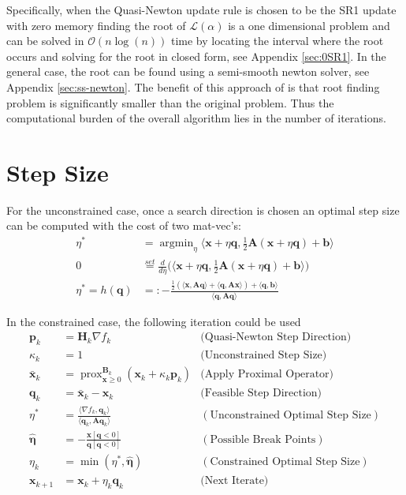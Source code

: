 \documentclass{article}
\newcommand{\x}{\mathbf{x}}
\renewcommand{\b}{\mathbf{b}}
\newcommand{\p}{\mathbf{p}}
\newcommand{\q}{\mathbf{q}}
\newcommand{\A}{\mathbf{A}}
\renewcommand{\H}{\mathbf{H}}
\newcommand{\B}{\mathbf{B}}
\newcommand{\prox}{\operatorname{prox}}
\newcommand{\argmin}{\operatorname{argmin}}
\begin{document}
Specifically, when the Quasi-Newton update rule is chosen to be the SR1 update with zero memory finding the root of $\mathcal{L}(\alpha)$ is a one dimensional problem and can be solved in $\mathcal{O}(n\log(n))$ time by locating the interval where the root occurs and solving for the root in closed form, see Appendix \ref{sec:0SR1}. In the general case, the root can be found using a semi-smooth newton solver, see Appendix \ref{sec:ss-newton}. The benefit of this approach of is that root finding problem is significantly smaller than the original problem. Thus the computational burden of the overall algorithm lies in the number of iterations.

\section{Step Size}
For the unconstrained case, once a search direction is chosen an optimal step size can be computed with the cost of two mat-vec's: 
\begin{align*}
    \eta^* &= \argmin_\eta \langle \x + \eta\q, \tfrac{1}{2}\A(\x + \eta\q) +\b\rangle \\
    0 &\stackrel{set}{=} \frac{d}{d\eta } \bigl(\langle \x + \eta\q, \tfrac{1}{2}\A(\x + \eta\q) +\b\rangle\bigr)\\
    \eta^* = h(\q) &=: -\frac{\tfrac{1}{2} (\langle \x, \A \q\rangle + \langle \q, \A \x\rangle) + \langle \q, \b\rangle}{\langle \q, \A \q\rangle}
\end{align*}

In the constrained case, the following iteration could be used 
\begin{align*}
    \p_k &= \H_k \nabla f_k &\text{(Quasi-Newton Step Direction)}\\
    \kappa_k &= 1 &\text{(Unconstrained Step Size)}\\
    \bar{\x}_k &= \prox_{\x\geq 0}^{\B_k}(\x_k +\kappa_k \p_k) &\text{(Apply Proximal Operator)}\\
    \q_k &= \bar{\x}_k - \x_k &\text{(Feasible Step Direction)}\\
    \eta^* &= \frac{\langle \nabla f_k, \q_k\rangle }{\langle \q_k,\A\q_k\rangle} &(\text{Unconstrained Optimal Step Size}) \\
    \hat{\boldsymbol{\eta}} &= - \frac{\x[\q<0]}{\q[\q<0]} &(\text{Possible Break Points}) \\
    \eta_k &= \min(\eta^*, \hat{\boldsymbol{\eta}}) &(\text{Constrained Optimal  Step Size}) \\
    \x_{k+1} &= \x_k + \eta_k \q_k &\text{(Next Iterate)}
\end{align*}
\end{document}
